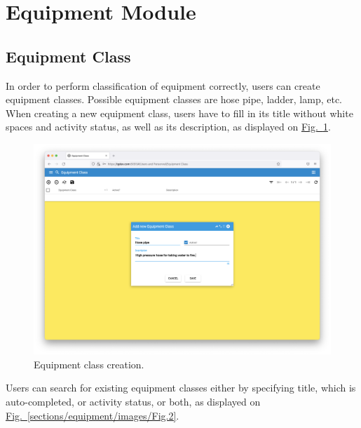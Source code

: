 \section{Equipment Module}\label{sec:01}

\subsection{Equipment Class}

In order to perform classification of equipment correctly, users can create equipment classes. Possible equipment classes are hose pipe, ladder, lamp, etc. When creating a new equipment class, users have to fill in its title without white spaces and activity status, as well as its description, as displayed on \hyperref[sections/equipment/images/Fig.1]{Fig.~\ref*{sections/equipment/images/Fig.1}}.

	\begin{figure}[!htbp]
	\centering
	\includegraphics[width=0.95\linewidth]{sections/equipment/images/Fig.1.png}
	\caption{Equipment class creation.}\label{sections/equipment/images/Fig.1}
	\end{figure}
	
Users can search for existing equipment classes either by specifying title, which is auto-completed, or activity status, or both, as displayed on \hyperref[sections/equipment/images/Fig.2]{Fig.~\ref*{sections/equipment/images/Fig.2}}.

